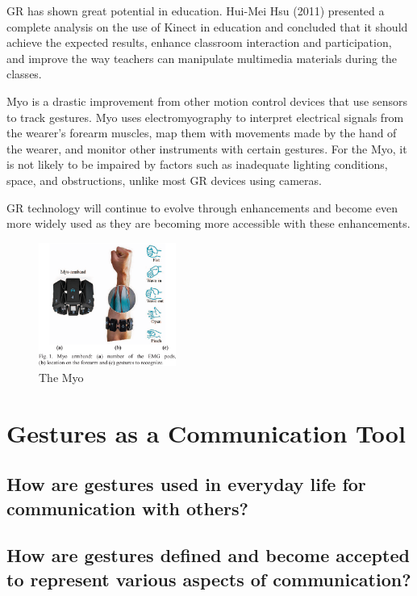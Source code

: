 \documentclass{article}
\begin{document}
GR has shown great potential in education. Hui-Mei Hsu (2011) presented a complete analysis on the use of Kinect in education and concluded that it should achieve the expected results, enhance classroom interaction and participation, and improve the way teachers can manipulate multimedia materials during the classes.

Myo is a drastic improvement from other motion control devices that use sensors to track gestures. Myo uses electromyography to interpret electrical signals from the wearer's forearm muscles, map them with movements made by the hand of the wearer, and monitor other instruments with certain gestures. For the Myo, it is not likely to be impaired by factors such as inadequate lighting conditions, space, and obstructions, unlike most GR devices using cameras. 
\cite{ref13}

GR technology will continue to evolve through enhancements and become even more widely used as they are becoming more accessible with these enhancements.

\begin{figure}[!ht]
    \caption{The Myo}
    \label{image:MYO}
    \centering
    \includegraphics[width=0.4\textwidth]{pics/myo.png}
\end{figure}


\section{Gestures as a Communication Tool}

\subsection{How are gestures used in everyday life for communication with others?}
\subsection{How are gestures defined and become accepted to represent various aspects of
communication?}
\end{document}
